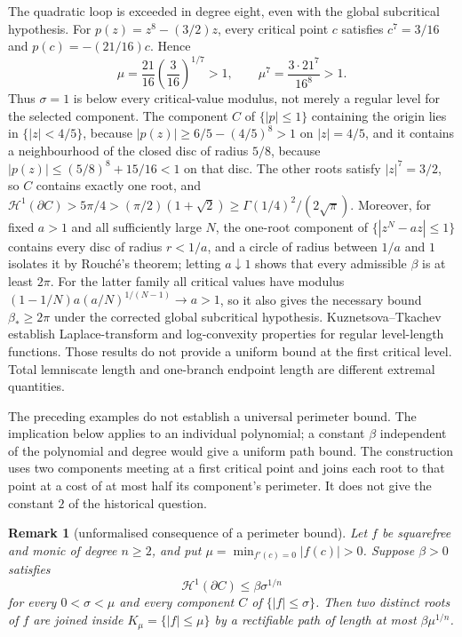 \documentclass[11pt]{article}
\newtheorem{remark}[theorem]{Remark}
\begin{document}
The quadratic loop is exceeded in degree eight, even with the global
subcritical hypothesis. For $p(z)=z^8-(3/2)z$, every critical point $c$
satisfies $c^7=3/16$ and $p(c)=-(21/16)c$. Hence
\[
 \mu=\frac{21}{16}\left(\frac3{16}\right)^{1/7}>1,
 \qquad \mu^7=\frac{3\cdot21^7}{16^8}>1.
\]
Thus $\sigma=1$ is below every critical-value modulus, not merely a
regular level for the selected component. The component $C$ of
$\{|p|\le1\}$ containing the origin lies in
$\{|z|<4/5\}$, because $|p(z)|\ge6/5-(4/5)^8>1$ on $|z|=4/5$, and it contains a
neighbourhood of the closed disc of radius $5/8$, because
$|p(z)|\le(5/8)^8+15/16<1$ on that disc.  The other roots satisfy
$|z|^7=3/2$, so $C$ contains exactly one root, and
$\mathcal H^1(\partial C)>5\pi/4>(\pi/2)(1+\sqrt2)\ge\Gamma(1/4)^2/(2\sqrt\pi)$.  Moreover,
for fixed $a>1$ and all sufficiently large $N$, the one-root component of
$\{|z^N-az|\le1\}$ contains every disc of radius $r<1/a$, and a circle of
radius between $1/a$ and $1$ isolates it by Rouch\'e's theorem; letting
$a\downarrow1$ shows that every admissible $\beta$ is at least $2\pi$.
For the latter family all critical values have modulus
$(1-1/N)a(a/N)^{1/(N-1)}\to a>1$, so it also gives the necessary bound
$\beta_*\ge2\pi$ under the corrected global subcritical hypothesis.
Kuznetsova--Tkachev \cite[Theorems~1--2]{kuznetsova2003} establish
Laplace-transform and log-convexity properties for regular level-length
functions.  Those results do not provide a uniform bound at the first
critical level.  Total lemniscate length and one-branch endpoint length are
different extremal quantities.

The preceding examples do not establish a universal perimeter bound.
The implication below applies to an individual polynomial; a constant
$\beta$ independent of the polynomial and degree would give a uniform
path bound. The construction uses two components meeting at a first
critical point and joins each root to that point at a cost of at most
half its component's perimeter. It does not give the constant $2$ of
the historical question.

\begin{remark}[unformalised consequence of a perimeter bound]
\label{res:conjecture-p-consumer}
Let $f$ be squarefree and monic of degree $n\ge2$, and put
$\mu=\min_{f'(c)=0}|f(c)|>0$. Suppose $\beta>0$ satisfies
\[
 \mathcal H^1(\partial C)\le\beta\sigma^{1/n}
\]
for every $0<\sigma<\mu$ and every component $C$ of $\{|f|\le\sigma\}$.
Then two distinct roots of $f$ are joined inside $K_\mu=\{|f|\le\mu\}$
by a rectifiable path of length at most $\beta\mu^{1/n}$.
\end{remark}
\end{document}
